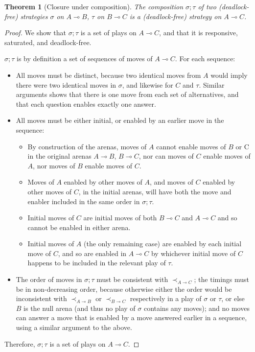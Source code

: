 \documentclass{article}
\newtheorem{theorem}{Theorem}
\begin{document}
\begin{theorem}[Closure under composition]
  The composition $\sigma;\tau$ of two (deadlock-free) strategies $\sigma$ on $A\multimap B$, $\tau$ on $B\multimap C$ is a (deadlock-free) strategy on $A\multimap C$.
\end{theorem}
\begin{proof}
  We show that $\sigma;\tau$ is a set of plays on $A\multimap C$, and that it is responsive, saturated, and deadlock-free.

  $\sigma;\tau$ is by definition a set of sequences of moves of $A\multimap C$. For each sequence:
  \begin{itemize}
    \item All moves must be distinct, because two identical moves from $A$ would imply there were two identical moves in $\sigma$, and likewise for $C$ and $\tau$. Similar arguments shows that there is one move from each set of alternatives, and that each question enables exactly one answer.
    \item All moves must be either initial, or enabled by an earlier move in the sequence: 
      \begin{itemize}
      \item By construction of the arenas, moves of $A$ cannot enable moves of $B$ or C in the original arenas $A\multimap B$, $B\multimap C$, nor can moves of $C$ enable moves of $A$, nor moves of $B$ enable moves of $C$.
      \item Moves of $A$ enabled by other moves of $A$, and moves of $C$ enabled by other moves of $C$, in the initial arenas, will have both the move and enabler included in the same order in $\sigma;\tau$.
      \item Initial moves of $C$ are initial moves of both $B\multimap C$ and $A\multimap C$ and so cannot be enabled in either arena.
      \item Initial moves of $A$ (the only remaining case) are enabled by each initial move of $C$, and so are enabled in $A\multimap C$ by whichever initial move of $C$ happens to be included in the relevant play of $\tau$.
      \end{itemize}
    \item The order of moves in $\sigma;\tau$ must be consistent with ${\prec}_{A\multimap C}$; the timings must be in non-decreasing order, because otherwise either the order would be inconsistent with $\prec_{A\multimap B}$ or $\prec_{B\multimap C}$ respectively in a play of $\sigma$ or $\tau$, or else $B$ is the null arena (and thus no play of $\sigma$ contains any moves); and no moves can answer a move that is enabled by a move answered earlier in a sequence, using a similar argument to the above.
  \end{itemize}
  Therefore, $\sigma;\tau$ is a set of plays on $A\multimap C$.


\end{proof}
\end{document}
